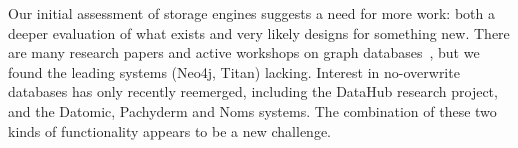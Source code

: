 \documentclass{sig-alternate}
\begin{document}


Our initial assessment of storage engines suggests a need for more work: both a deeper evaluation of what exists and very likely designs for something new. There are many research papers and active workshops on graph databases~\cite{grades16}, but we found the leading systems (Neo4j, Titan) lacking. 
Interest in no-overwrite databases has only recently reemerged, including the DataHub research project, and the Datomic, Pachyderm and Noms systems.  The combination of these two kinds of functionality 
appears to be a new challenge.


\end{document}
